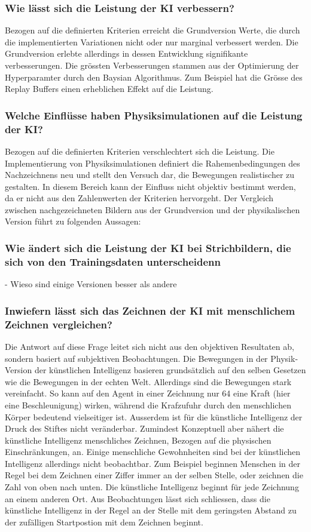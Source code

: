 \subsubsection*{Wie lässt sich die Leistung der KI verbessern?}
Bezogen auf die definierten Kriterien erreicht die Grundversion Werte, die
durch die implementierten Variationen nicht oder nur marginal verbessert
werden. Die Grundversion erlebte allerdings in dessen Entwicklung
signifikante verbesserungen. Die grössten Verbesserungen stammen aus der
Optimierung der Hyperparamter durch den Baysian Algorithmus. Zum Beispiel
hat die Grösse des Replay Buffers einen erheblichen Effekt auf die Leistung.

\subsubsection*{Welche Einflüsse haben Physiksimulationen auf die Leistung der KI?}
Bezogen auf die definierten Kriterien verschlechtert sich die Leistung. Die
Implementierung von Physiksimulationen definiert die Rahemenbedingungen des
Nachzeichnens neu und stellt den Versuch dar, die Bewegungen realistischer zu
gestalten. In diesem Bereich kann der Einfluss nicht objektiv bestimmt werden,
da er nicht aus den Zahlenwerten der Kriterien hervorgeht. Der Vergleich
zwischen nachgezeichneten Bildern aus der Grundversion und der physikalischen Version führt zu
folgenden Aussagen:

\subsubsection*{Wie ändert sich die Leistung der KI bei Strichbildern, die sich von den Trainingsdaten unterscheidenn}
- Wieso sind einige Versionen besser als andere %

\subsubsection*{Inwiefern lässt sich das Zeichnen der KI mit menschlichem Zeichnen vergleichen?}
Die Antwort auf diese Frage leitet sich nicht aus den objektiven Resultaten
ab, sondern basiert auf subjektiven Beobachtungen. Die Bewegungen in der
Physik-Version der künstlichen Intelligenz basieren grundsätzlich auf den
selben Gesetzen wie die Bewegungen in der echten Welt. Allerdings sind die
Bewegungen stark vereinfacht. So kann auf den Agent in einer Zeichnung nur 64
eine Kraft (hier eine Beschleunigung) wirken, während die Krafzufuhr durch den
menschlichen Körper bedeutend vielseitiger ist. Ausserdem ist für die
künstliche Intelligenz der Druck des Stiftes nicht veränderbar. Zumindest
Konzeptuell aber nähert die künstliche Intelligenz menschliches Zeichnen,
Bezogen auf die physischen Einschränkungen, an. Einige menschliche
Gewohnheiten sind bei der künstlichen Intelligenz allerdings nicht
beobachtbar. Zum Beispiel beginnen Menschen in der Regel bei dem Zeichnen
einer Ziffer immer an der selben Stelle, oder zeichnen die Zahl von oben nach
unten. Die künstliche Intelligenz beginnt für jede Zeichnung an einem anderen
Ort. Aus Beobachtungen lässt sich schliessen, dass die künstliche Intelligenz
in der Regel an der Stelle mit dem geringsten Abstand zu der zufälligen
Startpostion mit dem Zeichnen beginnt.


